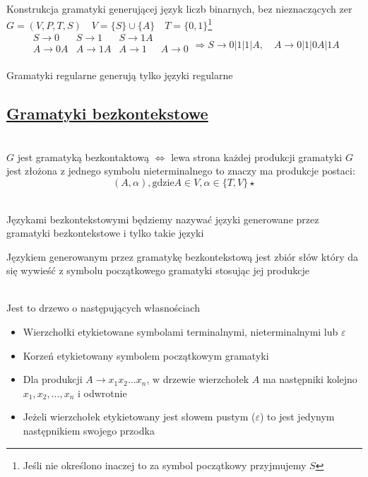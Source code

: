 	\begin{przyklad}
		Konstrukcja gramatyki generującej język liczb binarnych, bez nieznaczących zer \\
		$G = (V, P, T, S) \quad V = \{S\} \cup \{A\} \quad T = \{0, 1\}$\footnote{Jeśli nie określono inaczej to 
		za symbol początkowy przyjmujemy $S$}
		$$
		\begin{matrix}
		S \to 0 & S \to 1 & S \to 1A \\
		A \to 0A & A \to 1A & A \to 1 & A \to 0\\		
		\end{matrix}
		\Rightarrow
		S \to 0|1|1|A, \quad A \to 0|1|0A|1A
		$$
	\end{przyklad}		
	
	\begin{tw}
		Gramatyki regularne generują tylko języki regularne
	\end{tw}
		
\subsection{\href{http://pl.wikipedia.org/wiki/Gramatyka_bezkontekstowa}{Gramatyki bezkontekstowe}}
	
	\begin{df}~\\
		$G$ jest gramatyką bezkontaktową $\Leftrightarrow$ lewa strona każdej produkcji gramatyki $G$ jest złożona z jednego symbolu
		nieterminalnego to znaczy ma produkcje postaci:
			$$
				(A, \alpha), \text{gdzie} A\in V, \alpha \in \{T,V\}\star
			$$
	\end{df}
	
	\begin{df}~\\
		Językami bezkontekstowymi będziemy nazywać języki generowane przez gramatyki bezkontekstowe i tylko takie języki		
		
		\begin{uwaga}
			Językiem generowanym przez gramatykę bezkontekstową jest zbiór słów który da się wywieść z symbolu początkowego gramatyki stosując
			jej produkcje
		\end{uwaga}
	\end{df}
	
	\begin{df}~\\
		Jest to drzewo o następujących własnościach
		\begin{itemize}
			\item Wierzchołki etykietowane symbolami terminalnymi, nieterminalnymi lub $\varepsilon$
			\item Korzeń etykietowany symbolem początkowym gramatyki
			\item Dla produkcji $A\rightarrow x_1x_2 \dots x_n$, w drzewie wierzchołek $A$ ma następniki 
			kolejno $x_1, x_2, ..., x_n$ i odwrotnie
			\item Jeżeli wierzchołek etykietowany jest słowem pustym ($\varepsilon$) to jest jedynym
			następnikiem swojego przodka
		\end{itemize}
	\end{df}


